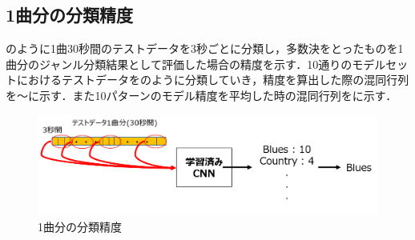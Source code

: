 \subsection{1曲分の分類精度}
のように1曲30秒間のテストデータを3秒ごとに分類し，多数決をとったものを1曲分のジャンル分類結果として評価した場合の精度を示す．10通りのモデルセットにおけるテストデータをのように分類していき，精度を算出した際の混同行列を～に示す．また10パターンのモデル精度を平均した時の混同行列をに示す．
\begin{figure}[htbp]
	\begin{center}
		\includegraphics[scale=0.7]{./images/classify-model/classify30s.png}
		\caption{1曲分の分類精度}
		\label{fig:classify30s}
	\end{center}
\end{figure}
\newpage
